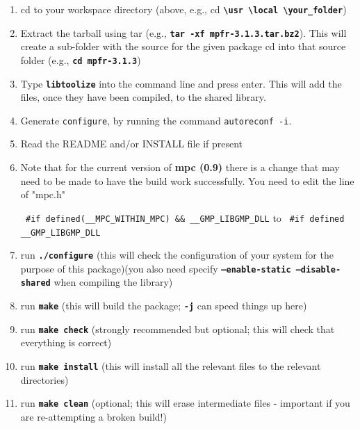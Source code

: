\begin{enumerate}

\item cd to your workspace directory (above, e.g., cd \textbf{\texttt{\textbackslash{usr} \textbackslash{local} \textbackslash{your\_folder}}})
\item Extract the tarball using tar (e.g., \textbf{\texttt{tar -xf mpfr-3.1.3.tar.bz2}}). This will create a sub-folder with the source for the given package
cd into that source folder (e.g., \textbf{\texttt{cd mpfr-3.1.3}})
\item Type \textbf{\texttt{libtoolize}} into the command line and press enter. This will add the files, once they have been compiled, to the shared library.
\item Generate {\tt configure}, by running the command {\tt autoreconf -i}.
\item Read the README and/or INSTALL file if present
\item Note that for the current version of \textbf{mpc (0.9)} there is a change that may need to be made to have the build work successfully. You need to edit the line of "mpc.h"

\begin{minipage}{0.9\linewidth}
\centering
    \begingroup
    \texttt{%
    \#if defined(\_\_MPC\_WITHIN\_MPC) \&\& \_\_GMP\_LIBGMP\_DLL}
    to
    \texttt{%
    \#if defined \_\_GMP\_LIBGMP\_DLL}
    \endgroup
\end{minipage}

\item run \textbf{\texttt{./configure}} (this will check the configuration of your system for the purpose of this package)(you also need specify \textbf{\texttt{--enable-static --disable-shared}} when compiling the library)
\item run \textbf{\texttt{make}} (this will build the package; \textbf{\texttt{-j}} can speed things up here)
\item run \textbf{\texttt{make check}} (strongly recommended but optional; this will check that everything is correct)
\item run \textbf{\texttt{make install}} (this will install all the relevant files to the relevant directories)
\item run \textbf{\texttt{make clean}} (optional; this will erase intermediate files - important if you are re-attempting a broken build!)

\end{enumerate}








